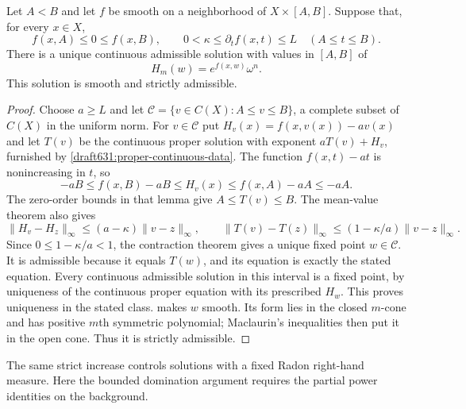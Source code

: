 \begin{theorem}\label{draft631:proper-variable-existence}
Let $A<B$ and let $f$ be smooth on a neighborhood of
$X\times[A,B]$. Suppose that, for every $x\in X$,
\[
 f(x,A)\leq0\leq f(x,B),\qquad
 0<\kappa\leq\partial_t f(x,t)\leq L\quad(A\leq t\leq B).
\]
There is a unique continuous admissible solution with values in
$[A,B]$ of
\[
 H_m(w)=e^{f(x,w)}\omega^n.
\]
This solution is smooth and strictly admissible.
\end{theorem}
\begin{proof}
Choose $a\geq L$ and let
$\mathcal C=\{v\in C(X):A\leq v\leq B\}$, a complete subset of
$C(X)$ in the uniform norm. For $v\in\mathcal C$ put
$H_v(x)=f(x,v(x))-av(x)$ and let $T(v)$ be the continuous proper
solution with exponent $aT(v)+H_v$, furnished by
\cref{draft631:proper-continuous-data}. The function $f(x,t)-at$
is nonincreasing in $t$, so
\[
 -aB\leq f(x,B)-aB\leq H_v(x)
                   \leq f(x,A)-aA\leq-aA.
\]
The zero-order bounds in that lemma give $A\leq T(v)\leq B$.
The mean-value theorem also gives
\[
 \|H_v-H_z\|_\infty\leq(a-\kappa)\|v-z\|_\infty,
 \qquad
 \|T(v)-T(z)\|_\infty
          \leq(1-\kappa/a)\|v-z\|_\infty.
\]
Since $0\leq1-\kappa/a<1$, the contraction theorem gives a unique
fixed point $w\in\mathcal C$. It is admissible because it equals
$T(w)$, and its equation is exactly the stated equation. Every
continuous admissible solution in this interval is a fixed point,
by uniqueness of the continuous proper equation with its prescribed
$H_w$. This proves uniqueness in the stated class.
 makes $w$ smooth.
Its form lies in the closed $m$-cone and has positive $m$th
symmetric polynomial; Maclaurin's inequalities then put it in the
open cone. Thus it is strictly admissible.
\end{proof}

The same strict increase controls solutions with a fixed Radon
right-hand measure. Here the bounded domination argument requires
the partial power identities on the background.

